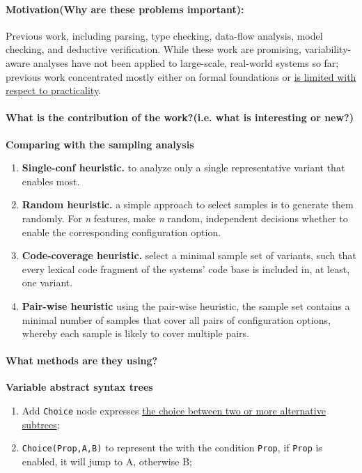\documentclass[12pt]{article}
\begin{document}
\paragraph{Motivation(Why are these problems important):} Previous work, including parsing, type checking, data-flow analysis, model checking, and deductive verification. While these work are promising, variability-aware analyses have not been applied to large-scale, real-world systems so far; previous work concentrated mostly either on formal foundations or \underline{is limited with respect to practicality}.

\paragraph{What is the contribution of the work?(i.e. what is interesting or new?)} 
\textbf{Comparing with the sampling analysis}
\begin{enumerate}
	\item \textbf{Single-conf heuristic.} to analyze only a single representative variant that enables most.
	\item \textbf{Random heuristic.} a simple approach to select samples is to generate them randomly. For \textit{n} features, make \textit{n} random, independent decisions whether to enable the corresponding configuration option.
	\item \textbf{Code-coverage heuristic.} select a minimal sample set of variants, such that every lexical code fragment of the systems' code base is included in, at least, one variant.
	\item \textbf{Pair-wise heuristic} using the pair-wise heuristic, the sample set contains a minimal number of samples that cover all pairs of configuration options, whereby each sample is likely to cover multiple pairs.
\end{enumerate}


\paragraph{What methods are they using?}
\textbf{Variable abstract syntax trees}\\
\begin{enumerate}
	\item Add \texttt{Choice} node expresses \underline{the choice between two or more alternative subtrees};
	\item \texttt{Choice(Prop,A,B)} to represent the with the condition \texttt{Prop}, if  \texttt{Prop} is enabled, it will jump to A, otherwise B;
\end{enumerate}
\end{document}
